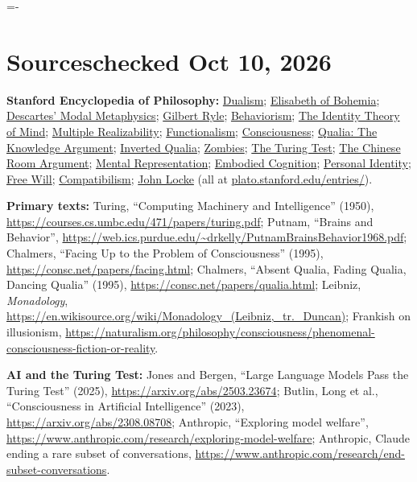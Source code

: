 \documentclass[11pt,letterpaper]{article}
\makeatletter
\newcommand{\keep}[1]{\par\penalty\z@\begingroup\dimen@=#1\relax\dimen@ii=\pagegoal\advance\dimen@ii-\pagetotal
  \ifdim\dimen@>\dimen@ii\ifdim\dimen@ii>\z@\vfil\break\fi\fi\endgroup}
\newcommand{\block}[2]{\keep{6\baselineskip}\section[#1]{#1\hfill{\normalsize\mdseries\color{muted}#2}}}
\makeatother
\begin{document}
\block{Sources}{checked Oct 10, 2026}

{\footnotesize\raggedright
\textsf{\bfseries Stanford Encyclopedia of Philosophy:}
\href{https://plato.stanford.edu/entries/dualism/}{Dualism};
\href{https://plato.stanford.edu/entries/elisabeth-bohemia/}{Elisabeth of Bohemia};
\href{https://plato.stanford.edu/entries/descartes-modal/}{Descartes' Modal Metaphysics};
\href{https://plato.stanford.edu/entries/ryle/}{Gilbert Ryle};
\href{https://plato.stanford.edu/entries/behaviorism/}{Behaviorism};
\href{https://plato.stanford.edu/entries/mind-identity/}{The Identity Theory of Mind};
\href{https://plato.stanford.edu/entries/multiple-realizability/}{Multiple Realizability};
\href{https://plato.stanford.edu/entries/functionalism/}{Functionalism};
\href{https://plato.stanford.edu/entries/consciousness/}{Consciousness};
\href{https://plato.stanford.edu/entries/qualia-knowledge/}{Qualia: The Knowledge Argument};
\href{https://plato.stanford.edu/entries/qualia-inverted/}{Inverted Qualia};
\href{https://plato.stanford.edu/entries/zombies/}{Zombies};
\href{https://plato.stanford.edu/entries/turing-test/}{The Turing Test};
\href{https://plato.stanford.edu/entries/chinese-room/}{The Chinese Room Argument};
\href{https://plato.stanford.edu/entries/mental-representation/}{Mental Representation};
\href{https://plato.stanford.edu/entries/embodied-cognition/}{Embodied Cognition};
\href{https://plato.stanford.edu/entries/identity-personal/}{Personal Identity};
\href{https://plato.stanford.edu/entries/freewill/}{Free Will};
\href{https://plato.stanford.edu/entries/compatibilism/}{Compatibilism};
\href{https://plato.stanford.edu/entries/locke/}{John Locke}
(all at \url{plato.stanford.edu/entries/}).

\textsf{\bfseries Primary texts:}
Turing, ``Computing Machinery and Intelligence'' (1950), \url{https://courses.cs.umbc.edu/471/papers/turing.pdf};
Putnam, ``Brains and Behavior'', \url{https://web.ics.purdue.edu/~drkelly/PutnamBrainsBehavior1968.pdf};
Chalmers, ``Facing Up to the Problem of Consciousness'' (1995), \url{https://consc.net/papers/facing.html};
Chalmers, ``Absent Qualia, Fading Qualia, Dancing Qualia'' (1995), \url{https://consc.net/papers/qualia.html};
Leibniz, \emph{Monadology}, \url{https://en.wikisource.org/wiki/Monadology_(Leibniz,_tr._Duncan)};
Frankish on illusionism, \url{https://naturalism.org/philosophy/consciousness/phenomenal-consciousness-fiction-or-reality}.

\textsf{\bfseries AI and the Turing Test:}
Jones and Bergen, ``Large Language Models Pass the Turing Test'' (2025), \url{https://arxiv.org/abs/2503.23674};
Butlin, Long et al., ``Consciousness in Artificial Intelligence'' (2023), \url{https://arxiv.org/abs/2308.08708};
Anthropic, ``Exploring model welfare'', \url{https://www.anthropic.com/research/exploring-model-welfare};
Anthropic, Claude ending a rare subset of conversations, \url{https://www.anthropic.com/research/end-subset-conversations}.

}
\end{document}
